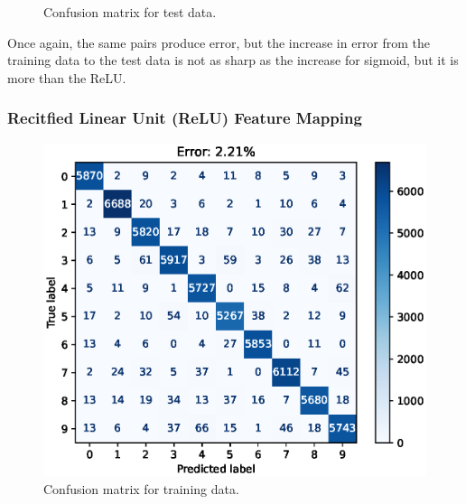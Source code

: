 \documentclass{article}
\begin{document}
\begin{figure}[h!]
\begin{minipage}{0.5\textwidth}
        \caption{Confusion matrix for test data.}
    \end{minipage}
\end{figure}
Once again, the same pairs produce error, but the increase in error from the training data to the test data is not as sharp as the increase for sigmoid, but it is more than the ReLU.

\FloatBarrier
\subsubsection{Recitfied Linear Unit (ReLU) Feature Mapping}
\begin{figure}[h!]
    \centering
    \begin{minipage}{0.5\textwidth}
        \centering
        \includegraphics[width=\textwidth]{images/one_vs_one_training_confusion_matrix_ReLU.eps}
        \caption{Confusion matrix for training data.}
    \end{minipage}\hfill
    \begin{minipage}{0.5\textwidth}
        \centering

\end{minipage}
\end{figure}
\end{document}
